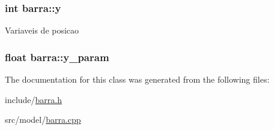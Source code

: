 \subsubsection[{\texorpdfstring{y}{y}}]{\setlength{\rightskip}{0pt plus 5cm}int barra\+::y\hspace{0.3cm}{\ttfamily [private]}}\hypertarget{classbarra_a93b604008af3593ac1b80366c387f2e9}{}\label{classbarra_a93b604008af3593ac1b80366c387f2e9}
Variaveis de posicao 
\subsubsection[{\texorpdfstring{y\+\_\+param}{y_param}}]{\setlength{\rightskip}{0pt plus 5cm}float barra\+::y\+\_\+param\hspace{0.3cm}{\ttfamily [private]}}\hypertarget{classbarra_a90bcebf4760d9c8deba7b0f94aa2a155}{}\label{classbarra_a90bcebf4760d9c8deba7b0f94aa2a155}


The documentation for this class was generated from the following files\+:\begin{DoxyCompactItemize}
\item 
include/\hyperlink{barra_8h}{barra.\+h}\item 
src/model/\hyperlink{barra_8cpp}{barra.\+cpp}\end{DoxyCompactItemize}
